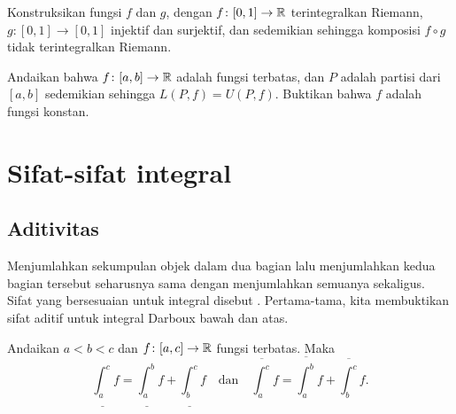 \begin{exercise}[Menantang]
Konstruksikan fungsi $f$ dan $g$, 
dengan
$f \colon [0,1] \to {\mathbb{R}}$ terintegralkan Riemann,
$g \colon [0,1] \to [0,1]$ injektif dan surjektif,
dan sedemikian sehingga komposisi $f \circ g$ tidak terintegralkan Riemann.
\end{exercise}

\begin{exercise}
Andaikan bahwa $f \colon [a,b] \to {\mathbb{R}}$ adalah fungsi terbatas, dan $P$ adalah
partisi dari $[a,b]$ sedemikian sehingga $L(P,f)=U(P,f)$.  Buktikan bahwa $f$ adalah
fungsi konstan.
\end{exercise}



\sectionnewpage
\section{Sifat-sifat integral}
\label{sec:rintprop}



\subsection{Aditivitas}

Menjumlahkan sekumpulan objek dalam dua bagian lalu menjumlahkan kedua bagian tersebut
seharusnya sama dengan menjumlahkan semuanya sekaligus.
Sifat yang bersesuaian untuk integral disebut
.  Pertama-tama, kita membuktikan sifat aditif
untuk integral Darboux bawah dan atas.

\begin{lemma} \label{lemma:darbouxadd}
Andaikan $a < b < c$ dan $f \colon [a,c] \to {\mathbb{R}}$ fungsi terbatas.
Maka
\begin{equation*}
\underline{\int_a^c} f
=
\underline{\int_a^b} f
+
\underline{\int_b^c} f
\quad \text{dan} \quad
\overline{\int_a^c} f
=
\overline{\int_a^b} f
+
\overline{\int_b^c} f .
\end{equation*}
\end{lemma}

